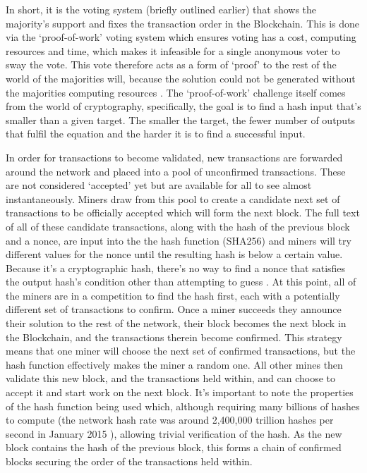 \documentclass{article}
\begin{document}
In short, it is the voting system (briefly outlined earlier) that shows the majority’s support and fixes the transaction order in the Blockchain. This is done via the `proof-of-work' voting system which ensures voting has a cost, computing resources and time, which makes it infeasible for a single anonymous voter to sway the vote. This vote therefore acts as a form of `proof' to the rest of the world of the majorities will, because the solution could not be generated without the majorities computing resources \citep{24_distributed_ledgers_and_blockchain_technology_2016}. The `proof-of-work' challenge itself comes from the world of cryptography, specifically, the goal is to find a hash input that’s smaller than a given target. The smaller the target, the fewer number of outputs that fulfil the equation and the harder it is to find a successful input.

In order for transactions to become validated, new transactions are forwarded around the network and placed into a pool of unconfirmed transactions. These are not considered `accepted' yet but are available for all to see almost instantaneously. Miners draw from this pool to create a candidate next set of transactions to be officially accepted which will form the next block. The full text of all of these candidate transactions, along with the hash of the previous block and a nonce, are input into the the hash function (SHA256) and miners will try different values for the nonce until the resulting hash is below a certain value. Because it’s a cryptographic hash, there’s no way to find a nonce that satisfies the output hash’s condition other than attempting to guess \citep{20_developer_guide_bitcoin_2016}. At this point, all of the miners are in a competition to find the hash first, each with a potentially different set of transactions to confirm. Once a miner succeeds they announce their solution to the rest of the network, their block becomes the next block in the Blockchain, and the transactions therein become confirmed. This strategy means that one miner will choose the next set of confirmed transactions, but the hash function effectively makes the miner a random one. All other mines then validate this new block, and the transactions held within, and can choose to accept it and start work on the next block. It's important to note the properties of the hash function being used which, although requiring many billions of hashes to compute (the network hash rate was around 2,400,000 trillion hashes per second in January 2015 \citep{34_hash_per_second_bitcoin_wiki_2016}), allowing trivial verification of the hash. As the new block contains the hash of the previous block, this forms a chain of confirmed blocks securing the order of the transactions held within.
\end{document}

